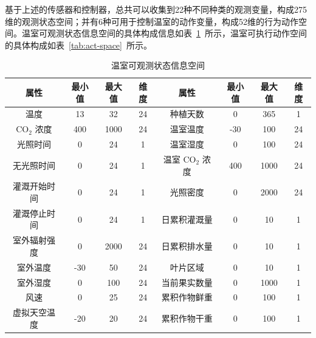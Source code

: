 基于上述的传感器和控制器，总共可以收集到22种不同种类的观测变量，构成275维的观测状态空间；并有6种可用于控制温室的动作变量，构成52维的行为动作空间。温室可观测状态信息空间的具体构成信息如表~\ref{tab:obs-space}~所示，温室可执行动作空间的具体构成如表~\ref{tab:act-space}~所示。

\begin{table}[ht]
\centering
\caption{温室可观测状态信息空间}
\begin{tabular}{cccc|cccc}
\toprule
\textbf{属性} & \textbf{最小值} & \textbf{最大值} & \textbf{维度} & \textbf{属性} & \textbf{最小值} & \textbf{最大值} & \textbf{维度}\\
\midrule
温度  & 13           & 32           & 24           & 种植天数                                     & 0            & 365          & 1            \\
CO$_2$ 浓度                                   & 400          & 1000         & 24           & 温室温度                        & -30          & 100          & 24           \\
光照时间                                     & 0            & 24           & 1            & 温室湿度                            & 0            & 100          & 24           \\
无光照时间                                    & 0            & 24           & 1            & 温室 CO$_2$ 浓度               & 400          & 1000         & 24           \\
灌溉开始时间                             & 0            & 24           & 1            & 光照密度                   & 0            & 2000         & 24           \\
灌溉停止时间                              & 0            & 24           & 1            & 日累积灌溉量           & 0            & 10           & 1            \\
室外辐射强度                           & 0            & 2000         & 24           & 日累积排水量                & 0            & 10           & 1            \\
室外温度                               & -30          & 50           & 24           & 叶片区域                                   & 0            & 10           & 1            \\
室外湿度                                  & 0            & 100          & 24           & 当前果实数量                  & 0            & 1000         & 1            \\
风速                                        & 0            & 25           & 24           & 累积作物鲜重 & 0            & 100          & 1            \\
虚拟天空温度                           & -20          & 20           & 24           & 累积作物干重   & 0            & 100          & 1            \\
\bottomrule
\end{tabular}
\label{tab:obs-space}
\end{table}

